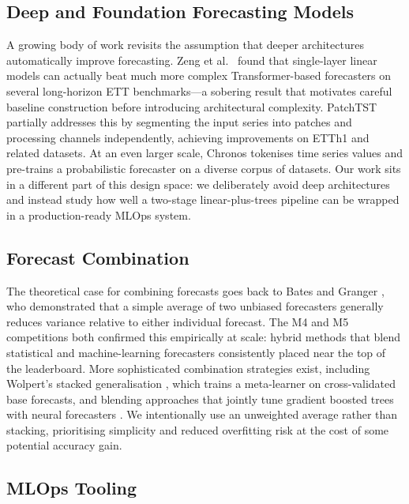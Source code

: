 \documentclass[conference]{IEEEtran}
\begin{document}
  \subsection{Deep and Foundation Forecasting Models}

  A growing body of work revisits the assumption that deeper architectures
  automatically improve forecasting. Zeng et al.\ \cite{zeng2023transformers}
  found that single-layer linear models can actually beat much more complex
  Transformer-based forecasters on several long-horizon ETT benchmarks---a sobering
  result that motivates careful baseline construction before introducing architectural
  complexity. PatchTST \cite{nie2023patchtst} partially addresses this by segmenting
  the input series into patches and processing channels independently, achieving
  improvements on ETTh1 and related datasets. At an even larger scale, Chronos
  \cite{ansari2024chronos} tokenises time series values and pre-trains a probabilistic
  forecaster on a diverse corpus of datasets. Our work sits in a different part of
  this design space: we deliberately avoid deep architectures and instead study how
  well a two-stage linear-plus-trees pipeline can be wrapped in a production-ready
  MLOps system.

  \subsection{Forecast Combination}

  The theoretical case for combining forecasts goes back to Bates and Granger
  \cite{bates1969combination}, who demonstrated that a simple average of two unbiased
  forecasters generally reduces variance relative to either individual forecast. The M4
  \cite{makridakis2018m4} and M5 \cite{makridakis2022m5} competitions both confirmed
  this empirically at scale: hybrid methods that blend statistical and machine-learning
  forecasters consistently placed near the top of the leaderboard. More sophisticated
  combination strategies exist, including Wolpert's stacked generalisation
  \cite{wolpert1992stacked}, which trains a meta-learner on cross-validated base
  forecasts, and blending approaches that jointly tune gradient boosted trees with
  neural forecasters \cite{vogklis2022blending}. We intentionally use an unweighted
  average rather than stacking, prioritising simplicity and reduced overfitting risk
  at the cost of some potential accuracy gain.

  \subsection{MLOps Tooling}
\end{document}
